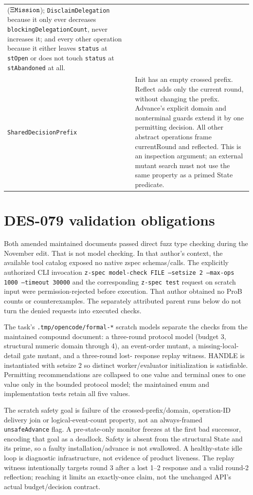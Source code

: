 \documentclass[a4paper,10pt,fleqn]{article}
\newcommand{\fpath}[1]{\nolinkurl{#1}}
\newcommand{\field}[1]{\ifmmode\texttt{#1}\else\texorpdfstring{\breakfield{#1}}{#1}\fi}
\begin{document}
\begin{longtable}{@{}>{\raggedright\arraybackslash}p{}>{\raggedright\arraybackslash}p{}@{}}
  ($\Xi \field{Mission}$); \field{DisclaimDelegation} because it only
  ever decreases \field{blockingDelegationCount}, never increases it;
  and every other operation because it either leaves \field{status} at
  \field{stOpen} or does not touch \field{status} at \field{stAbandoned}
  at all. \\
\field{SharedDecisionPrefix} &
  Init has an empty crossed prefix. Reflect adds only the current
  round, without changing the prefix. Advance's explicit domain and
  nonterminal guards extend it by one permitting decision. All other
  abstract operations frame currentRound and reflected. This is an
  inspection argument; an external mutant search must not use the
  same property as a primed State predicate. \\
\end{longtable}

\section{DES-079 validation obligations}
\label{sec:des079-validation}

Both amended maintained documents passed direct fuzz type checking
during the November edit. That is not model checking. In that author's
context, the available tool catalog exposed no native zspec schemas/calls.
The explicitly authorized CLI invocation
\texttt{z-spec model-check FILE --setsize 2 --max-ops 1000 --timeout 30000}
and the corresponding \texttt{z-spec test} request on scratch input
were permission-rejected before execution. That author obtained no ProB
counts or counterexamples. The separately attributed parent runs below
do not turn the denied requests into executed checks.

The task's \fpath{.tmp/opencode/formal-*} scratch models separate the
checks from the maintained compound document: a three-round protocol
model (budget 3, structural numeric domain through 4), an event-order
mutant, a missing-local-detail gate mutant, and a three-round lost-
response replay witness. HANDLE is instantiated with setsize 2 so
distinct worker/evaluator initialization is satisfiable. Permitting
recommendations are collapsed to one value and terminal ones to one
value only in the bounded protocol model; the maintained enum and
implementation tests retain all five values.

The scratch safety goal is failure of the crossed-prefix/domain,
operation-ID delivery join or logical-event-count property, not an
always-framed \field{unsafeAdvance} flag. A pre-state-only monitor
freezes at the first bad successor, encoding that goal as a deadlock.
Safety is absent from the structural State and its prime, so a faulty
installation/advance is not swallowed. A healthy-state idle loop is
diagnostic infrastructure, not evidence of product liveness. The
replay witness intentionally targets round 3 after a lost 1--2 response
and a valid round-2 reflection; reaching it limits an exactly-once
claim, not the unchanged API's actual budget/decision contract.
\end{document}
